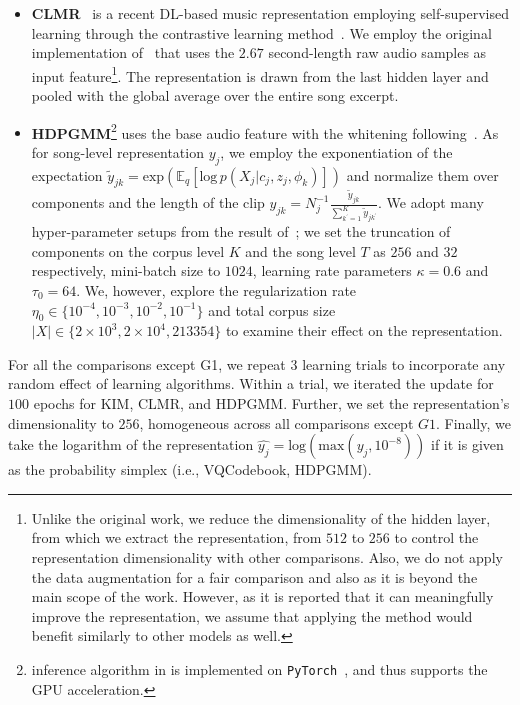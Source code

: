 \documentclass{article}
\begin{document}
\begin{itemize}[noitemsep, leftmargin=*]
    \item \textbf{CLMR}~\cite{DBLP:conf/ismir/SpijkervetB21} is a recent DL-based music representation employing self-supervised learning through the contrastive learning method~\cite{DBLP:conf/icml/ChenK0H20}. We employ the original implementation of~\cite{DBLP:conf/ismir/SpijkervetB21} that uses the $2.67$ second-length raw audio samples as input feature\footnote{Unlike the original work, we reduce the dimensionality of the hidden layer, from which we extract the representation, from $512$ to $256$ to control the representation dimensionality with other comparisons. Also, we do not apply the data augmentation for a fair comparison and also as it is beyond the main scope of the work. However, as it is reported that it can meaningfully improve the representation, we assume that applying the method would benefit similarly to other models as well.}. The representation is drawn from the last hidden layer and pooled with the global average over the entire song excerpt.

    \item \textbf{HDPGMM}\footnote{inference algorithm in  is implemented on \texttt{PyTorch}~\cite{NEURIPS2019_9015}, and thus supports the GPU acceleration.} uses the base audio feature with the whitening following~\cite{DBLP:conf/ismir/NamHSS12}. As for song-level representation $y_{j}$, we employ the  exponentiation of the expectation $\tilde{y}_{jk} = \text{exp}(\mathbb{E}_{q}[\text{log}\,p(X_{j}|c_{j}, z_{j}, \phi_{k})])$ and normalize them over components and the length of the clip $y_{jk} = N_{j}^{-1}\frac{\tilde{y}_{jk}}{\sum_{k^{\prime}=1}^{K}\tilde{y}_{jk^{\prime}}}$. We adopt many hyper-parameter setups from the result of~\cite{DBLP:journals/jmlr/WangPB11}; we set the truncation of components on the corpus level $K$ and the song level $T$ as $256$ and $32$ respectively, mini-batch size to $1024$, learning rate parameters $\kappa=0.6$ and $\tau_{0}=64$. We, however, explore the regularization rate $\eta_{0} \in \{10^{-4}, 10^{-3}, 10^{-2}, 10^{-1}\}$ and total corpus size $|X| \in \{2\times10^{3}, 2\times10^{4}, 213354\}$ to examine their effect on the representation.
\end{itemize}

For all the comparisons except G1, we repeat $3$ learning trials to incorporate any random effect of learning algorithms. Within a trial, we iterated the update for $100$ epochs for KIM, CLMR, and HDPGMM. Further, we set the representation's dimensionality to $256$, homogeneous across all comparisons except $G1$. Finally, we take the logarithm of the representation $\hat{y_{j}} = \text{log}(\text{max}(y_{j}, 10^{-8}))$ if it is given as the probability simplex (i.e., VQCodebook, HDPGMM).
\end{document}

